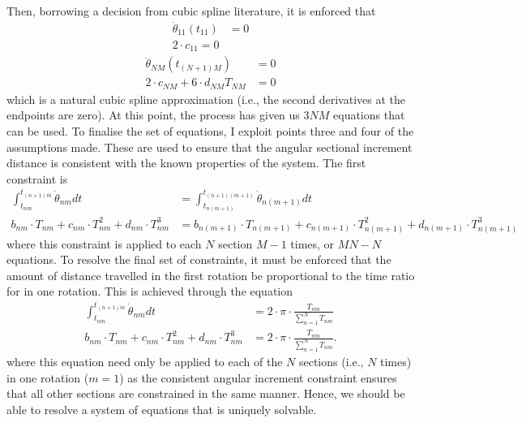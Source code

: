\documentclass{article}
\begin{document}
	Then, borrowing a decision from cubic spline literature, it is enforced that
	\begin{equation}
		\begin{aligned}
			\ddot{\theta}_{11}(t_{11}) &= 0 \\
			2 \cdot c_{11}  = 0
		\end{aligned}
	\end{equation}
	\begin{equation}
		\begin{aligned}
			\ddot{\theta}_{NM}(t_{(N + 1)M}) &= 0 \\
			2 \cdot c_{NM} + 6 \cdot d_{NM} T_{NM} &= 0
		\end{aligned}
	\end{equation}
	which is a natural cubic spline approximation (i.e., the second derivatives at the endpoints are zero). At this point, the process has given us $3NM$ equations that can be used. To finalise the set of equations, I exploit points three and four of the assumptions made. These are used to ensure that the angular sectional increment distance is consistent with the known properties of the system. The first constraint is
	\begin{equation}
		\begin{aligned}
			\int_{t_{nm}}^{t_{(n+1)m}} \dot{\theta}_{nm}dt &= \int_{t_{n(m + 1)}}^{t_{(n+1)(m + 1)}} \dot{\theta}_{n(m + 1)}dt \\
			b_{nm} \cdot T_{nm} + c_{nm} \cdot T_{nm}^2 + d_{nm} \cdot T_{nm}^3 &= b_{n(m+1)} \cdot T_{n(m+1)} + c_{n(m+1)} \cdot T_{n(m+1)}^2 + d_{n(m+1)} \cdot T_{n(m+1)}^3
		\end{aligned}
	\end{equation} 
	where this constraint is applied to each $N$ section $M-1$ times, or $MN - N$ equations. To resolve the final set of constraints, it must be enforced that the amount of distance travelled in the first rotation be proportional to the time ratio for in one rotation. This is achieved through the equation
	\begin{equation}\label{eq:poor_assumption}
		\begin{aligned}
		\int_{t_{nm}}^{t_{(n+1)m}} \dot{\theta}_{nm}dt &= 2 \cdot \pi \cdot \frac{T_{nm}}{\sum_{n=1}^{N}T_{nm}} \\
		b_{nm} \cdot T_{nm} + c_{nm} \cdot T_{nm}^2 + d_{nm} \cdot T_{nm}^3 &= 2 \cdot \pi \cdot \frac{T_{nm}}{\sum_{n=1}^{N}T_{nm}}.
		\end{aligned}
	\end{equation}
	where this equation need only be applied to each of the $N$ sections (i.e., $N$ times) in one rotation ($m = 1$) as the consistent angular increment constraint ensures that all other sections are constrained in the same manner. Hence, we should be able to resolve a system of equations that is uniquely solvable. 
	
\end{document}
